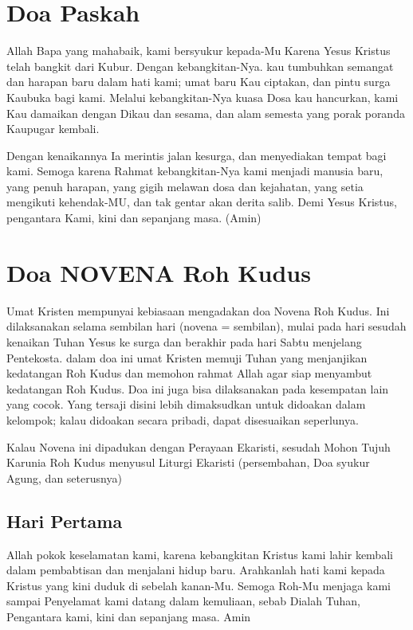 \documentclass{article}
\begin{document}
\section[Doa Paskah]{Doa Paskah}
Allah Bapa yang mahabaik, kami bersyukur kepada-Mu Karena Yesus Kristus
telah bangkit dari Kubur. Dengan kebangkitan-Nya. kau tumbuhkan
semangat dan harapan baru dalam hati kami; umat baru Kau ciptakan, dan
pintu surga Kaubuka bagi kami. Melalui kebangkitan-Nya kuasa Dosa kau
hancurkan, kami Kau damaikan dengan Dikau dan sesama, dan alam semesta
yang porak poranda Kaupugar kembali.

Dengan kenaikannya Ia merintis jalan kesurga, dan menyediakan tempat
bagi kami. Semoga karena Rahmat kebangkitan-Nya kami menjadi manusia
baru, yang penuh harapan, yang gigih melawan dosa dan kejahatan, yang
setia mengikuti kehendak-MU, dan tak gentar akan derita salib. Demi
Yesus Kristus, pengantara Kami, kini dan sepanjang masa. (Amin)

\section[Doa NOVENA Roh Kudus]{Doa NOVENA Roh Kudus}
Umat Kristen mempunyai kebiasaan mengadakan doa Novena Roh Kudus. Ini
dilaksanakan selama sembilan hari (novena = sembilan), mulai pada hari
sesudah kenaikan Tuhan Yesus ke surga dan berakhir pada hari Sabtu
menjelang Pentekosta. dalam doa ini umat Kristen memuji Tuhan yang
menjanjikan kedatangan Roh Kudus dan memohon rahmat Allah agar siap
menyambut kedatangan Roh Kudus. Doa ini juga bisa dilaksanakan pada
kesempatan lain yang cocok. Yang tersaji disini lebih dimaksudkan untuk
didoakan dalam kelompok; kalau didoakan secara pribadi, dapat
disesuaikan seperlunya.

Kalau Novena ini dipadukan dengan Perayaan Ekaristi, sesudah Mohon Tujuh
Karunia Roh Kudus menyusul Liturgi Ekaristi (persembahan, Doa syukur
Agung, dan seterusnya)

\subsection[Hari Pertama]{Hari Pertama}
Allah pokok keselamatan kami, karena kebangkitan Kristus kami lahir
kembali dalam pembabtisan dan menjalani hidup baru. Arahkanlah hati
kami kepada Kristus yang kini duduk di sebelah kanan-Mu. Semoga Roh-Mu
menjaga kami sampai Penyelamat kami datang dalam kemuliaan, sebab
Dialah Tuhan, Pengantara kami, kini dan sepanjang masa. Amin
\end{document}
